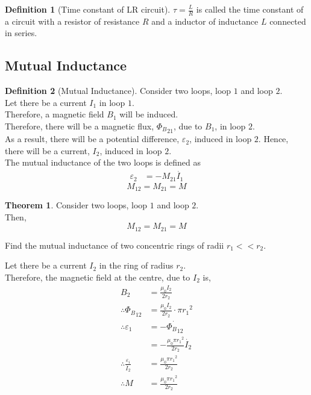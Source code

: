 \documentclass[fleqn, a4paper, 12pt, twoside]{article}
\theoremstyle{definition}
\newtheorem{definition}{Definition}
\theoremstyle{theorem}
\newtheorem{theorem}{Theorem}
\begin{document}
\begin{definition}[Time constant of LR circuit]
	$\tau = \frac{L}{R}$ is called the time constant of a circuit with a resistor of resistance $R$ and a inductor of inductance $L$ connected in series.
\end{definition}

\subsection{Mutual Inductance}

\begin{definition}[Mutual Inductance]
	Consider two loops, loop $1$ and loop $2$.\\
	Let there be a current $I_1$ in loop $1$.\\
	Therefore, a magnetic field $B_1$ will be induced.\\
	Therefore, there will be a magnetic flux, ${\Phi_{B}}_{2 1}$, due to $B_1$, in loop $2$.\\
	As a result, there will be a potential difference, $\varepsilon_2$, induced in loop $2$.
	Hence, there will be a current, $I_2$, induced in loop $2$.\\
	The mutual inductance of the two loops is defined as
	\begin{align*}
		\varepsilon_2 &= -M_{2 1} \dot{I_1}
	\end{align*}
	\begin{equation*}
		M_{1 2} = M_{2 1} = M
	\end{equation*}
\end{definition}

\begin{theorem}
	Consider two loops, loop $1$ and loop $2$.\\
	Then,
	\begin{equation*}
		M_{1 2} = M_{2 1} = M
	\end{equation*}
\end{theorem}

\begin{question}
	Find the mutual inductance of two concentric rings of radii $r_1 << r_2$.
\end{question}

\begin{solution}
	Let there be a current $I_2$ in the ring of radius $r_2$.\\
	Therefore, the magnetic field at the centre, due to $I_2$ is,
	\begin{align*}
		B_2 &= \frac{\mu_0 I_2}{2 r_2}\\
		\therefore {\Phi_B}_{1 2} &= \frac{\mu_0 I_2}{2 r_2} \cdot \pi {r_1}^2\\
		\therefore \varepsilon_1 &= -\dot{{\Phi_B}_{1 2}}\\
		&= -\frac{\mu_0 \pi {r_1}^2}{2 r_2} \dot{I_2}\\
		\therefore \frac{\varepsilon_i}{\dot{I_2}} &= \frac{\mu_0 \pi {r_1}^2}{2 r_2}\\
		\therefore M &= \frac{\mu_0 \pi {r_1}^2}{2 r_2}
	\end{align*}
\end{solution}
\end{document}
